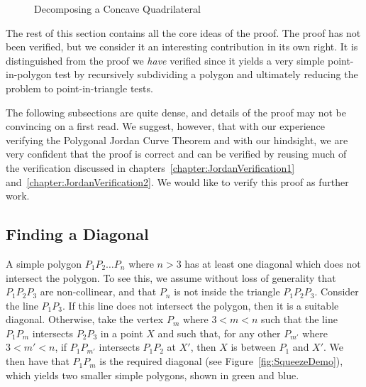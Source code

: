 \begin{figure}
  \centering 

  \caption{Decomposing a Concave Quadrilateral}
  \label{fig:quadDecompose}
\end{figure}

The rest of this section contains all the core ideas of the proof. The proof has not been verified, but we consider it an interesting contribution in its own right. It is distinguished from the proof we \emph{have} verified since it yields a very simple point-in-polygon test by recursively subdividing a polygon and ultimately reducing the problem to point-in-triangle tests.

The following subsections are quite dense, and details of the proof may not be convincing on a first read. We suggest, however, that with our experience verifying the Polygonal Jordan Curve Theorem and with our hindsight, we are very confident that the proof is correct and can be verified by reusing much of the verification discussed in chapters~\ref{chapter:JordanVerification1} and~\ref{chapter:JordanVerification2}. We would like to verify this proof as further work. 

\subsection{Finding a Diagonal}\label{sec:FindingDiagonal}
A simple polygon $P_1P_2 \ldots P_n$ where $n>3$ has at least one diagonal which does not intersect the polygon. To see this, we assume without loss of generality that $P_1P_2P_3$ are non-collinear, and that $P_n$ is not inside the triangle $P_1P_2P_3$. Consider the line $P_1P_3$. If this line does not intersect the polygon, then it is a suitable diagonal. Otherwise, take the vertex $P_m$ where $3 < m < n$ such that the line $P_1P_m$ intersects $P_2P_3$ in a point $X$ and such that, for any other $P_{m'}$ where $3 < m' < n$, if $P_1P_{m'}$ intersects $P_1P_2$ at $X'$, then $X$ is between $P_1$ and $X'$. We then have that $P_1P_m$ is the required diagonal (see Figure~\ref{fig:SqueezeDemo}), which yields two smaller simple polygons, shown in green and blue.

